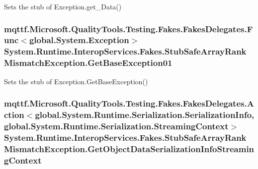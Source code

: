 Sets the stub of Exception.\-get\-\_\-\-Data()

\hypertarget{class_system_1_1_runtime_1_1_interop_services_1_1_fakes_1_1_stub_safe_array_rank_mismatch_exception_aabcd5fcc0b5358af729f302944ff3d9a}{
\subsubsection[{Get\-Base\-Exception01}]{\setlength{\rightskip}{0pt plus 5cm}mqttf.\-Microsoft.\-Quality\-Tools.\-Testing.\-Fakes.\-Fakes\-Delegates.\-Func$<$global.\-System.\-Exception$>$ System.\-Runtime.\-Interop\-Services.\-Fakes.\-Stub\-Safe\-Array\-Rank\-Mismatch\-Exception.\-Get\-Base\-Exception01}}\label{class_system_1_1_runtime_1_1_interop_services_1_1_fakes_1_1_stub_safe_array_rank_mismatch_exception_aabcd5fcc0b5358af729f302944ff3d9a}


Sets the stub of Exception.\-Get\-Base\-Exception()

\hypertarget{class_system_1_1_runtime_1_1_interop_services_1_1_fakes_1_1_stub_safe_array_rank_mismatch_exception_a4d4e921df35746ad27c9ef61e600ec88}{
\subsubsection[{Get\-Object\-Data\-Serialization\-Info\-Streaming\-Context}]{\setlength{\rightskip}{0pt plus 5cm}mqttf.\-Microsoft.\-Quality\-Tools.\-Testing.\-Fakes.\-Fakes\-Delegates.\-Action$<$global.\-System.\-Runtime.\-Serialization.\-Serialization\-Info, global.\-System.\-Runtime.\-Serialization.\-Streaming\-Context$>$ System.\-Runtime.\-Interop\-Services.\-Fakes.\-Stub\-Safe\-Array\-Rank\-Mismatch\-Exception.\-Get\-Object\-Data\-Serialization\-Info\-Streaming\-Context}}\label{class_system_1_1_runtime_1_1_interop_services_1_1_fakes_1_1_stub_safe_array_rank_mismatch_exception_a4d4e921df35746ad27c9ef61e600ec88}


